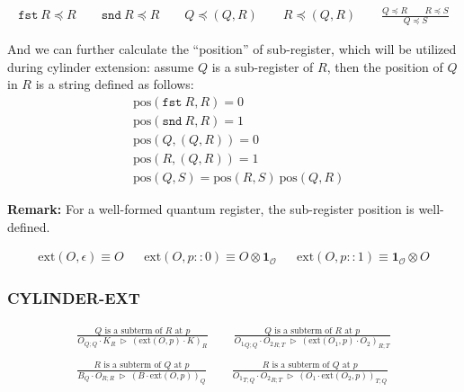 \documentclass[manuscript, review, timestamp]{acmart}
\newcommand*{\fst}{\texttt{fst}}
\newcommand*{\snd}{\texttt{snd}}
\newcommand*{\reduce}{\ \triangleright\ }
\begin{document}
\begin{definition}
  \begin{gather*}
    \fst\ R \preceq R \qquad \snd\ R \preceq R \qquad Q \preceq (Q, R) \qquad R \preceq (Q, R)
    \qquad 
    \frac{Q \preceq R \qquad R \preceq S}{Q \preceq S}
  \end{gather*}

  And we can further calculate the ``position'' of sub-register, which will be utilized during cylinder extension: assume $Q$ is a sub-register of $R$, then the position of $Q$ in $R$ is a string defined as follows:
  \begin{align*}
    & \textrm{pos}(\fst\ R, R) = 0 \\
    & \textrm{pos}(\snd\ R, R) = 1 \\
    & \textrm{pos}(Q, (Q, R)) = 0 \\
    & \textrm{pos}(R, (Q, R)) = 1 \\
    & \textrm{pos}(Q, S) = \textrm{pos}(R, S)\ \textrm{pos}(Q, R)
  \end{align*}
\end{definition}

\textbf{Remark:} For a well-formed quantum register, the sub-register position is well-defined.

\begin{definition}
  \begin{align*}
    \textrm{ext}(O, \epsilon) \equiv O
    && \textrm{ext}(O, p::0) \equiv O \otimes \mathbf{1}_\mathcal{O}
    && \textrm{ext}(O, p::1) \equiv \mathbf{1}_\mathcal{O} \otimes O
  \end{align*}
\end{definition}

\subsubsection*{\textsf{CYLINDER-EXT}}
\begin{gather*}
  \frac{Q \textrm{ is a subterm of } R \textrm{ at } p}{O_{Q; Q} \cdot K_{R} \reduce (\textrm{ext}(O, p) \cdot K)_{R}}
  \qquad
  \frac{Q \textrm{ is a subterm of } R \textrm{ at } p}{{O_1}_{Q; Q} \cdot {O_2}_{R; T} \reduce (\textrm{ext}(O_1, p) \cdot O_2)_{R; T}} \\
  \\
  \frac{R \textrm{ is a subterm of } Q \textrm{ at } p}{B_{Q} \cdot O_{R; R} \reduce (B \cdot \textrm{ext}(O, p))_{Q}}
  \qquad
  \frac{R \textrm{ is a subterm of } Q \textrm{ at } p}{{O_1}_{T; Q} \cdot {O_2}_{R; T} \reduce (O_1 \cdot \textrm{ext}(O_2, p))_{T; Q}} \\
\end{gather*}
\end{document}
